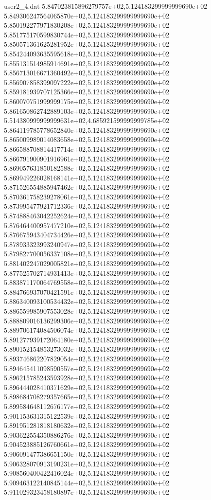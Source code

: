 \begin{filecontents}{user2_4.dat}
5.847023815896279757e+02,5.124183299999999690e+02
5.849306247564065870e+02,5.124183299999999690e+02
5.850192277971830208e+02,5.124183299999999690e+02
5.851775170599830744e+02,5.124183299999999690e+02
5.850571361625281952e+02,5.124183299999999690e+02
5.854244093635595618e+02,5.124183299999999690e+02
5.855131514985914691e+02,5.124183299999999690e+02
5.856713016671360492e+02,5.124183299999999690e+02
5.856907858399097222e+02,5.124183299999999690e+02
5.859181939707125366e+02,5.124183299999999690e+02
5.860070751999999175e+02,5.124183299999999690e+02
5.861650862742889103e+02,5.124183299999999690e+02
5.514380999999999631e+02,4.685921599999999785e+02
5.864119785778652840e+02,5.124183299999999690e+02
5.865009989014083658e+02,5.124183299999999690e+02
5.866588708814417714e+02,5.124183299999999690e+02
5.866791900901916961e+02,5.124183299999999690e+02
5.869057631850182588e+02,5.124183299999999690e+02
5.869949226028168141e+02,5.124183299999999690e+02
5.871526554885947462e+02,5.124183299999999690e+02
5.870361758239278061e+02,5.124183299999999690e+02
5.873995477921712336e+02,5.124183299999999690e+02
5.874888463042252624e+02,5.124183299999999690e+02
5.876464400957477210e+02,5.124183299999999690e+02
5.876675943404734426e+02,5.124183299999999690e+02
5.878933323993240947e+02,5.124183299999999690e+02
5.879827700056337108e+02,5.124183299999999690e+02
5.881402247029005821e+02,5.124183299999999690e+02
5.877525702714931413e+02,5.124183299999999690e+02
5.883871170064769558e+02,5.124183299999999690e+02
5.884766937070421591e+02,5.124183299999999690e+02
5.886340093100534432e+02,5.124183299999999690e+02
5.886559985907553028e+02,5.124183299999999690e+02
5.888809016136299306e+02,5.124183299999999690e+02
5.889706174084506074e+02,5.124183299999999690e+02
5.891277939172064180e+02,5.124183299999999690e+02
5.890152154853273032e+02,5.124183299999999690e+02
5.893746862207829054e+02,5.124183299999999690e+02
5.894645411098590557e+02,5.124183299999999690e+02
5.896215785243593928e+02,5.124183299999999690e+02
5.896444028410371629e+02,5.124183299999999690e+02
5.898684708279357665e+02,5.124183299999999690e+02
5.899584648112676177e+02,5.124183299999999690e+02
5.901153631315122539e+02,5.124183299999999690e+02
5.891951281818180632e+02,5.124183299999999690e+02
5.903622554350886276e+02,5.124183299999999690e+02
5.904523885126760661e+02,5.124183299999999690e+02
5.906091477386651150e+02,5.124183299999999690e+02
5.906328070913190231e+02,5.124183299999999690e+02
5.908560400422416024e+02,5.124183299999999690e+02
5.909463122140845144e+02,5.124183299999999690e+02
5.911029323458180897e+02,5.124183299999999690e+02

\end{filecontents}
